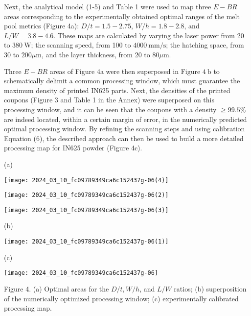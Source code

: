 \documentclass[10pt]{article}
\begin{document}
Next, the analytical model (1-5) and Table 1 were used to map three $E-B R$ areas corresponding to the experimentally obtained optimal ranges of the melt pool metrics (Figure 4a): $D / t=1.5-2.75$, $W / h=1.8-2.8$, and $L / W=3.8-4.6$. These maps are calculated by varying the laser power from 20 to $380 \mathrm{~W}$; the scanning speed, from 100 to $4000 \mathrm{~mm} / \mathrm{s}$; the hatching space, from 30 to $200 \mu \mathrm{m}$, and the layer thickness, from 20 to $80 \mu \mathrm{m}$.

Three $E-B R$ areas of Figure 4a were then superposed in Figure $4 \mathrm{~b}$ to schematically delimit a common processing window, which must guarantee the maximum density of printed IN625 parts. Next, the densities of the printed coupons (Figure 3 and Table 1 in the Annex) were superposed on this\\
processing window, and it can be seen that the coupons with a density $\geq 99.5 \%$ are indeed located, within a certain margin of error, in the numerically predicted optimal processing window. By refining the scanning steps and using calibration Equation (6), the described approach can then be used to build a more detailed processing map for IN625 powder (Figure 4c).

(a)

\begin{center}
\texttt{[image: 2024\_03\_10\_fc09789349ca6c152437g-06(4)]}
\end{center}

\begin{center}
\texttt{[image: 2024\_03\_10\_fc09789349ca6c152437g-06(2)]}
\end{center}

\begin{center}
\texttt{[image: 2024\_03\_10\_fc09789349ca6c152437g-06(3)]}
\end{center}

(b)

\begin{center}
\texttt{[image: 2024\_03\_10\_fc09789349ca6c152437g-06(1)]}
\end{center}

(c)

\begin{center}
\texttt{[image: 2024\_03\_10\_fc09789349ca6c152437g-06]}
\end{center}

Figure 4. (a) Optimal areas for the $D / t, W / h$, and $L / W$ ratios; (b) superposition of the numerically optimized processing window; (c) experimentally calibrated processing map.
\end{document}
